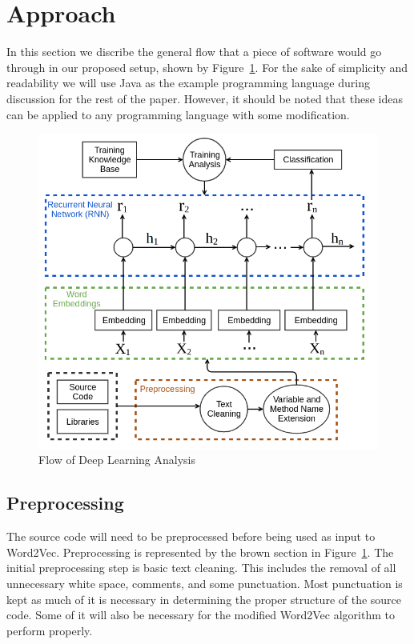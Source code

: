 \section{Approach} \label{approach}

In this section we discribe the general flow that a piece of software would go through in our proposed setup, shown by Figure~\ref{deeplearningflow}. For the sake of simplicity and readability we will use Java as the example programming language during discussion for the rest of the paper. However, it should be noted that these ideas can be applied to any programming language with some modification.

\begin{figure}
   \centering
   \includegraphics[scale=.36]{figures/deeplearningflow.png}
   \caption{Flow of Deep Learning Analysis}
   \vspace{-.6cm}
   \label{deeplearningflow}
\end{figure}

\subsection{Preprocessing}

The source code will need to be preprocessed before being used as input to Word2Vec. Preprocessing is represented by the brown section in Figure~\ref{deeplearningflow}. The initial preprocessing step is basic text cleaning. This includes the removal of all unnecessary white space, comments, and some punctuation. Most punctuation is kept as much of it is necessary in determining the proper structure of the source code. Some of it will also be necessary for the modified Word2Vec algorithm to perform properly.

